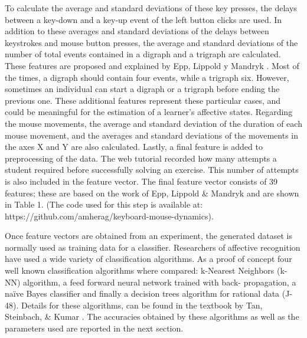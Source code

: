 \documentclass[conference]{IEEEtran}
\begin{document}
To calculate the average and standard deviations of these key presses, the delays
between a key-down and a key-up event of the left button clicks are used. In
addition to these averages and standard deviations of the delays between
keystrokes and mouse button presses, the average and standard deviations of the
number of total events contained in a digraph and a trigraph are calculated.
These features are proposed and explained by Epp, Lippold y Mandryk \cite{epp2011identifying}. Most
of the times, a digraph should contain four events, while a trigraph six.
However, sometimes an individual can start a digraph or a trigraph before ending
the previous one. These additional features represent these particular cases,
and could be meaningful for the estimation of a learner's affective states.
Regarding the mouse movements, the average and standard deviation of the
duration of each mouse movement, and the averages and standard deviations of the
movements in the axes X and Y are also calculated. Lastly, a final feature is
added to preprocessing of the data. The web tutorial recorded how many attempts
a student required before successfully solving an exercise. This number of
attempts is also included in the feature vector. The final feature vector
consists of 39 features; these are based on the work of Epp, Lippold \& Mandryk
\cite{epp2011identifying} and are shown in Table 1. (The code used for this step is available at:
https://github.com/amherag/keyboard-mouse-dynamics). %

Once feature vectors are obtained from an experiment, the generated dataset is
normally used as training data for a classifier. Researchers of affective
recognition have used a wide variety of classification algorithms. As a proof of
concept four well known classification algorithms where compared: k-Nearest
Neighbors (k-NN) algorithm, a feed forward neural network trained with back-
propagation, a naïve Bayes classifier and finally a decision trees algorithm for
rational data (J-48). Details for these algorithms, can be found in the textbook
by Tan, Steinbach, \& Kumar \cite{tan2006introduction}. The accuracies obtained by these algorithms
as well as the parameters used are reported in the next section.
\end{document}
